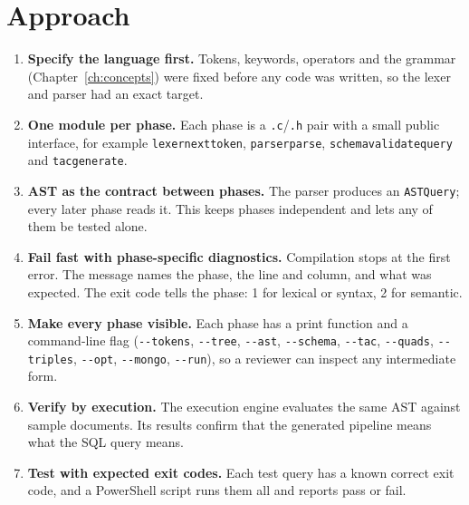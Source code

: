 \documentclass[12pt,a4paper]{report}
\newcommand{\codeus}{\textunderscore\allowbreak}
\DeclareRobustCommand{\code}[1]{\texttt{\let\_\codeus #1}}
\begin{document}
\section{Approach}
\begin{enumerate}
  \item \textbf{Specify the language first.} Tokens, keywords, operators and the grammar (Chapter~\ref{ch:concepts}) were fixed before any code was written, so the lexer and parser had an exact target.
  \item \textbf{One module per phase.} Each phase is a \code{.c}/\code{.h} pair with a small public interface, for example \code{lexer\_next\_token}, \code{parser\_parse}, \code{schema\_validate\_query} and \code{tac\_generate}.
  \item \textbf{AST as the contract between phases.} The parser produces an \code{ASTQuery}; every later phase reads it. This keeps phases independent and lets any of them be tested alone.
  \item \textbf{Fail fast with phase-specific diagnostics.} Compilation stops at the first error. The message names the phase, the line and column, and what was expected. The exit code tells the phase: 1 for lexical or syntax, 2 for semantic.
  \item \textbf{Make every phase visible.} Each phase has a print function and a command-line flag (\code{-{}-tokens}, \code{-{}-tree}, \code{-{}-ast}, \code{-{}-schema}, \code{-{}-tac}, \code{-{}-quads}, \code{-{}-triples}, \code{-{}-opt}, \code{-{}-mongo}, \code{-{}-run}), so a reviewer can inspect any intermediate form.
  \item \textbf{Verify by execution.} The execution engine evaluates the same AST against sample documents. Its results confirm that the generated pipeline means what the SQL query means.
  \item \textbf{Test with expected exit codes.} Each test query has a known correct exit code, and a PowerShell script runs them all and reports pass or fail.
\end{enumerate}
\end{document}
